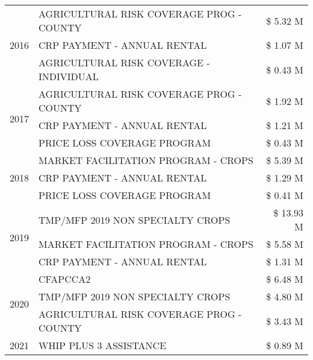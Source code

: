 \begin{tabular}{llr}
\cline{1-3}
\multirow[t]{3}{*}{2016} & AGRICULTURAL RISK COVERAGE PROG - COUNTY & \$ 5.32 M \\
 & CRP PAYMENT - ANNUAL RENTAL & \$ 1.07 M \\
 & AGRICULTURAL RISK COVERAGE - INDIVIDUAL & \$ 0.43 M \\
\cline{1-3}
\multirow[t]{3}{*}{2017} & AGRICULTURAL RISK COVERAGE PROG - COUNTY & \$ 1.92 M \\
 & CRP PAYMENT - ANNUAL RENTAL & \$ 1.21 M \\
 & PRICE LOSS COVERAGE PROGRAM & \$ 0.43 M \\
\cline{1-3}
\multirow[t]{3}{*}{2018} & MARKET FACILITATION PROGRAM - CROPS & \$ 5.39 M \\
 & CRP PAYMENT - ANNUAL RENTAL & \$ 1.29 M \\
 & PRICE LOSS COVERAGE PROGRAM & \$ 0.41 M \\
\cline{1-3}
\multirow[t]{3}{*}{2019} & TMP/MFP 2019 NON SPECIALTY CROPS & \$ 13.93 M \\
 & MARKET FACILITATION PROGRAM - CROPS & \$ 5.58 M \\
 & CRP PAYMENT - ANNUAL RENTAL & \$ 1.31 M \\
\cline{1-3}
\multirow[t]{3}{*}{2020} & CFAPCCA2 & \$ 6.48 M \\
 & TMP/MFP 2019 NON SPECIALTY CROPS & \$ 4.80 M \\
 & AGRICULTURAL RISK COVERAGE PROG - COUNTY & \$ 3.43 M \\
\cline{1-3}
2021 & WHIP PLUS 3 ASSISTANCE & \$ 0.89 M \\
\cline{1-3}
\bottomrule
\end{tabular}
